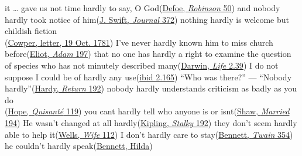 \ea \label{ex:07-47}
\ea it {\dots} gave us not time hardly to say, O God\hfill(\href{https://archive.org/details/lifeandstranges00dobsgoog/page/n75/mode/2up?q=%22not+time+hardly%22&view=theater}{Defoe, \textit{Robinson} 50}) %
\ex and nobody hardly took notice of him\hfill(\href{https://archive.org/details/journaltostellae00swifuoft/page/372/mode/2up?q=%22nobody+hardly+took%22&view=theater}{J. Swift, \textit{Journal} 372})
\ex nothing hardly is welcome but childish fiction\\\hfill(\href{https://www.gutenberg.org/cache/epub/47790/pg47790-images.html#Page_87}{Cowper, letter, 19 Oct. 1781})
\ex I've never hardly known him to miss church before\hfill(\href{https://archive.org/details/adambede00eliouoft/page/n213/mode/2up?q=%22him+to+miss+church%22&view=theater}{Eliot, \textit{Adam} 197})
\ex that no one has hardly a right to examine the question of species who has not minutely described many\hfill(\href{https://www.darwinproject.ac.uk/letter/DCP-LETT-915.xml}{Darwin, \textit{Life} 2.39})
\ex I do not suppose I could be of hardly any use\hfill(\href{https://www.darwinproject.ac.uk/letter/DCP-LETT-2490.xml}{ibid 2.165}) %
\ex ``Who was there?'' --- ``Nobody hardly''\hfill(\href{https://archive.org/details/returnofthenativ00harduoft/page/146/mode/2up?q=%22nobody+hardly%22&view=theater}{Hardy, \textit{Return} 192}) %
\ex nobody hardly understands criticism as badly as you do\\\hfill(\href{https://archive.org/details/quisantanovel00hopegoog/page/n130/mode/2up?q=%22hardly+understands+criticism%22&view=theater}{Hope, \textit{Quisanté} 119})
\ex you cant hardly tell who anyone is or isnt\hfill(\href{https://archive.org/details/doctorsdilemmage0000bern/page/260/mode/2up?q=%22tell+who+anyone+is%22&view=theater}{Shaw, \textit{Married} 194}) %
\ex He wasn't changed at all hardly\hfill(\href{https://archive.org/details/stalkyandco015455mbp/page/n189/mode/2up?q=%22changed+at+all+hardly%22&view=theater}{Kipling, \textit{Stalky} 192})
\ex they don't seem hardly able to help it\hfill(\href{https://archive.org/details/wifeofsirisaacha00well/page/112/mode/2up?q=%22seem+hardly+able+to%22&view=theater}{Wells, \textit{Wife} 112})
\ex I don't hardly care to stay\hfill(\href{https://archive.org/details/thesetwain0000arno_p9h0/page/362/mode/2up?q=%22don%27t+hardly+care+to+stay%22&view=theater}{Bennett, \textit{Twain} 354})
\ex he couldn't hardly speak\hfill(\href{https://archive.org/details/hildalessways00benn_2/page/12/mode/2up?q=%22couldn%27t+hardly%22&view=theater}{Bennett, Hilda})
\z
\z

